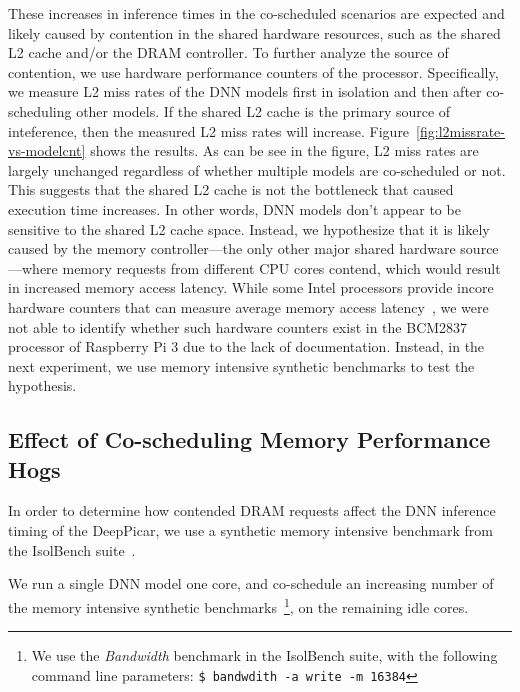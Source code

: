 These increases in inference times in the co-scheduled scenarios are
expected and likely caused by contention in the shared hardware
resources, such as the shared L2 cache and/or the DRAM controller.
To further analyze the source of contention, we use hardware
performance counters of the processor. Specifically, we measure L2
miss rates of the DNN models first in isolation and then after
co-scheduling other models. If the shared L2 cache is the primary
source of inteference, then the measured L2 miss rates will
increase. Figure~\ref{fig:l2missrate-vs-modelcnt} shows the results.
As can be see in the figure, L2 miss rates are largely unchanged
regardless of whether multiple models are co-scheduled or not. This
suggests that the shared L2 cache is not the bottleneck that caused
execution time increases. In other words, DNN models don't appear to be
sensitive to the shared L2 cache space. %
Instead, we hypothesize that it is likely caused by the memory
controller---the only other major shared hardware source---where
memory requests from different CPU cores contend, which would result
in increased memory access latency. While some Intel processors
provide incore hardware counters that can measure average memory
access latency~\cite{ye2016maracas}, we were not able to identify
whether such hardware counters exist in the BCM2837 processor of
Raspberry Pi 3 due to the lack of documentation. Instead, in the next
experiment, we use memory intensive synthetic benchmarks to test the
hypothesis.

\subsection{Effect of Co-scheduling Memory Performance Hogs}\label{sec:eval-memhog}

In order to determine how contended DRAM requests affect the DNN
inference timing of the DeepPicar, we use a synthetic memory
intensive benchmark from the IsolBench suite~\cite{Valsan2016}.

We run a single DNN model one core, and
co-schedule an increasing number of the memory intensive synthetic
benchmarks~\footnote{We use the \emph{Bandwidth} benchmark in the
  IsolBench suite, with the following command line parameters: \texttt{\$
  bandwdith -a write -m 16384}}, on the remaining idle cores.

